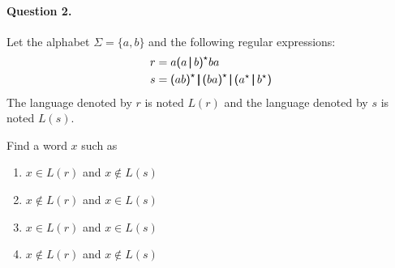 \paragraph{Question 2.} Let the alphabet \(\Sigma = \{a, b\}\) and the
following regular expressions:
\begin{align*}
    r &= a \textsf{(} a \, \pmb{\lvert}{} \, b \textsf{)}^{\star}{} ba\\
    s &= \textsf{(} ab \textsf{)}^{\star}{} \, \pmb{\lvert}{} \, \textsf{(} ba
    \textsf{)}^{\star}{} \, \pmb{\lvert}{} \, \textsf{(} a^{\star}{} 
    \, \pmb{\lvert}{} \, b^{\star}\textsf{)}
\end{align*}
The language denoted by \(r\) is noted \(L(r)\) and the language
denoted by \(s\) is noted \(L(s)\).

\bigskip

\noindent Find a word \(x\) such as
\begin{enumerate}

  \item \(x \in L(r)\) and \(x \not\in L(s)\)

  \item \(x \not\in L(r)\) and \(x \in L(s)\)

  \item \(x \in L(r)\) and \(x \in L(s)\)

  \item \(x \not\in L(r)\) and \(x \not\in L(s)\)

\end{enumerate}

